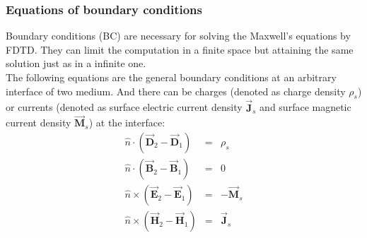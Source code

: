     \subsubsection{Equations of boundary conditions}\label{subsubsec:Equations of BC}
	  Boundary conditions (BC) are necessary for solving the  Maxwell's equations by FDTD. They can limit the computation in a finite space but attaining the same solution just as in a infinite one.  \\
	  The following equations are the general boundary conditions at an arbitrary interface of two medium. And there can be  charges (denoted as charge density $\rho_s$) or  currents (denoted as surface electric current density $\vec{\mathbf{J}}_s$ and  surface magnetic current density $\vec{\mathbf{M}}_s$) at the interface:
	      \begin{eqnarray}
		  \hat{n}\cdot(\vec{\mathbf{D}}_2-\vec{\mathbf{D}}_1) &=&\rho_s  \\
		  \hat{n}\cdot(\vec{\mathbf{B}}_2-\vec{\mathbf{B}}_1) &=&0  \\
		  \hat{n}\times(\vec{\mathbf{E}}_2-\vec{\mathbf{E}}_1) &=&-\vec{\mathbf{M}}_s \\
		  \hat{n}\times(\vec{\mathbf{H}}_2-\vec{\mathbf{H}}_1) &=&\vec{\mathbf{J}}_s
		  \label{eq:General boundary conditions}
	      \end{eqnarray}
